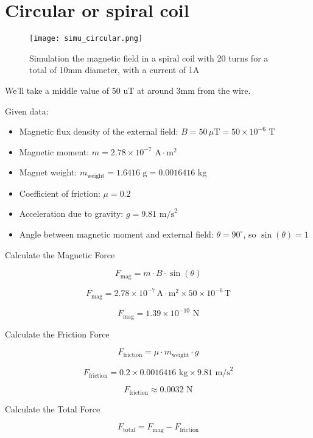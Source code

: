 \section{Circular or spiral coil}

\begin{figure}[H]
	\centering
	\texttt{[image: simu\_circular.png]}
	\caption[Simulation the magnetic field in a spiral coil]{Simulation the magnetic field in a spiral coil with 20 turns for a total of 10mm diameter, with a current of 1A}
	\label{fig:simu_spiral}
\end{figure}

We'll take a middle value of 50 uT at around 3mm from the wire.

Given data:
\begin{itemize}
	\item Magnetic flux density of the external field: \( B = 50 \, \mu\text{T} = 50 \times 10^{-6} \text{ T} \)
	\item Magnetic moment: \( m = 2.78 \times 10^{-7} \text{ A} \cdot \text{m}^2 \)
	\item Magnet weight: \( m_{\text{weight}} = 1.6416 \text{ g} = 0.0016416 \text{ kg} \)
	\item Coefficient of friction: \( \mu = 0.2 \)
	\item Acceleration due to gravity: \( g = 9.81 \text{ m/s}^2 \)
	\item Angle between magnetic moment and external field: \( \theta = 90^\circ \), so \( \sin(\theta) = 1 \)
\end{itemize}

Calculate the Magnetic Force

\[
	F_{\text{mag}} = m \cdot B \cdot \sin(\theta)
\]

\[
	F_{\text{mag}} = 2.78 \times 10^{-7} \, \text{A} \cdot \text{m}^2 \times 50 \times 10^{-6} \, \text{T}
\]

\[
	F_{\text{mag}} = 1.39 \times 10^{-10} \text{ N}
\]

Calculate the Friction Force

\[
	F_{\text{friction}} = \mu \cdot m_{\text{weight}} \cdot g
\]

\[
	F_{\text{friction}} = 0.2 \times 0.0016416 \text{ kg} \times 9.81 \text{ m/s}^2
\]

\[
	F_{\text{friction}} \approx 0.0032 \text{ N}
\]

Calculate the Total Force

\[
	F_{\text{total}} = F_{\text{mag}} - F_{\text{friction}}
\]

